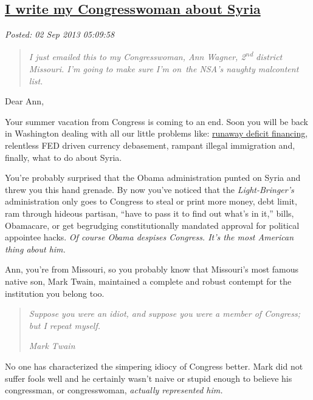 %

\subsection*{\href{http://bakerjd99.wordpress.com/2013/09/02/i-write-my-congresswoman-about-syria/}{I write my Congresswoman about Syria}}


\noindent\emph{Posted: 02 Sep 2013 05:09:58}
\vspace{6pt}

\begin{quote}
\emph{I just emailed this to my Congresswoman, Ann Wagner,
2\textsuperscript{nd} district Missouri. I'm going to make sure I'm
on~the NSA's naughty malcontent list.}
\end{quote}

\noindent Dear Ann,

\medskip

Your summer vacation from Congress is coming to an end. Soon you will be
back in Washington dealing with all our little problems like:
\href{http://www.usdebtclock.org/}{runaway deficit financing},
relentless FED driven currency debasement, rampant illegal immigration
and, finally, what to do about Syria.

You're probably surprised that the Obama administration punted on Syria
and threw you this hand grenade. By now you've noticed that the
\emph{Light-Bringer's} administration only goes to Congress to steal or
print more money, debt limit, ram through hideous partisan, ``have to
pass it to find out what's in it,'' bills, Obamacare, or get begrudging
constitutionally mandated approval for political appointee hacks.
\emph{Of course Obama despises Congress. It's the most American thing
about him.}

Ann, you're from Missouri, so you probably know that Missouri's most
famous native son, Mark Twain, maintained a complete and robust contempt
for the institution you belong too.

\begin{quote}
\emph{Suppose you were an idiot, and suppose you were a member of Congress;
but I repeat myself.}

\emph{Mark Twain}
\end{quote}

No one has characterized the simpering idiocy of Congress better. Mark
did not suffer fools well and he certainly wasn't naive or stupid enough
to believe his congressman, or congresswoman, \emph{actually represented
him.}

